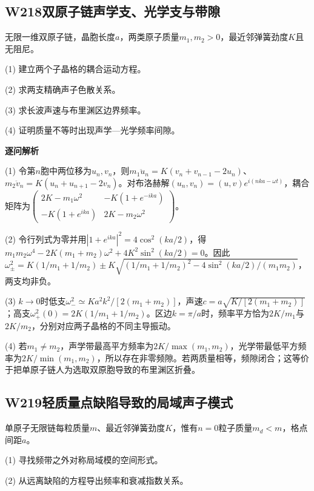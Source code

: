 
\subsection*{W218\quad 双原子链声学支、光学支与带隙}

无限一维双原子链，晶胞长度$a$，两类原子质量$m_1,m_2>0$，最近邻弹簧劲度$K$且无阻尼。

(1) 建立两个子晶格的耦合运动方程。

(2) 求两支精确声子色散关系。

(3) 求长波声速与布里渊区边界频率。

(4) 证明质量不等时出现声学—光学频率间隙。

\par\textbf{逐问解析}

(1) 令第$n$胞中两位移为$u_n,v_n$，则$m_1\ddot u_n=K(v_n+v_{n-1}-2u_n)$、$m_2\ddot v_n=K(u_n+u_{n+1}-2v_n)$。对布洛赫解$(u_n,v_n)=(u,v)e^{i(nka-\omega t)}$，耦合矩阵为$\begin{pmatrix}2K-m_1\omega^2&-K(1+e^{-ika})\\-K(1+e^{ika})&2K-m_2\omega^2\end{pmatrix}$。

(2) 令行列式为零并用$|1+e^{ika}|^2=4\cos^2(ka/2)$，得$m_1m_2\omega^4-2K(m_1+m_2)\omega^2+4K^2\sin^2(ka/2)=0$。因此$\omega_\pm^2=K(1/m_1+1/m_2)\pm K\sqrt{(1/m_1+1/m_2)^2-4\sin^2(ka/2)/(m_1m_2)}$，两支均非负。

(3) $k\to0$时低支$\omega_-^2\simeq Ka^2k^2/[2(m_1+m_2)]$，声速$c=a\sqrt{K/[2(m_1+m_2)]}$；高支$\omega_+^2(0)=2K(1/m_1+1/m_2)$。区边$k=\pi/a$时，频率平方恰为$2K/m_1$与$2K/m_2$，分别对应两子晶格的不同主导振动。

(4) 若$m_1\ne m_2$，声学带最高平方频率为$2K/\max(m_1,m_2)$，光学带最低平方频率为$2K/\min(m_1,m_2)$，所以存在非零频隙。若两质量相等，频隙闭合；这等价于把单原子链人为选取双原胞导致的布里渊区折叠。

\par\medskip

\subsection*{W219\quad 轻质量点缺陷导致的局域声子模式}

单原子无限链每粒质量$m$、最近邻弹簧劲度$K$，惟有$n=0$粒子质量$m_d<m$，格点间距$a$。

(1) 寻找频带之外对称局域模的空间形式。

(2) 从远离缺陷的方程导出频率和衰减指数关系。

